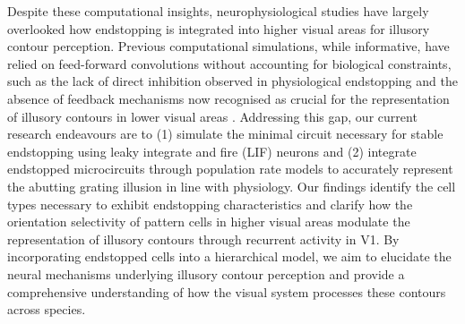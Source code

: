 \documentclass[12pt]{article}
\begin{document}
\bigbreak
Despite these computational insights, neurophysiological studies have largely overlooked how endstopping is integrated into higher visual areas for illusory contour perception. Previous computational simulations, while informative, have relied on feed-forward convolutions without accounting for biological constraints, such as the lack of direct inhibition observed in physiological endstopping \autocite{sillitoContributionExcitatoryInhibitory1977} and the absence of feedback mechanisms now recognised as crucial for the representation of illusory contours in lower visual areas \autocite{pakTopDownFeedbackControls2020}. Addressing this gap, our current research endeavours are to (1) simulate the minimal circuit necessary for stable endstopping using leaky integrate and fire (LIF) neurons and (2) integrate endstopped microcircuits through population rate models to accurately represent the abutting grating illusion in line with physiology. Our findings identify the cell types necessary to exhibit endstopping characteristics and clarify how the orientation selectivity of pattern cells in higher visual areas modulate the representation of illusory contours through recurrent activity in V1. By incorporating endstopped cells into a hierarchical model, we aim to elucidate the neural mechanisms underlying illusory contour perception and provide a comprehensive understanding of how the visual system processes these contours across species.

\newpage
\end{document}
